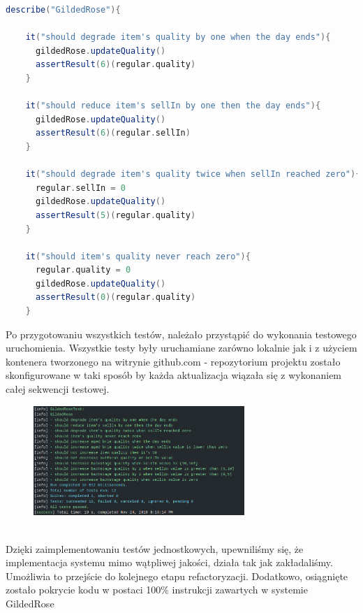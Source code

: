 \documentclass[a4paper, 11pt]{article}
\begin{document}
\begin{lstlisting}[language=scala]
  describe("GildedRose"){

    it("should degrade item's quality by one when the day ends"){
      gildedRose.updateQuality()
      assertResult(6)(regular.quality)
    }

    it("should reduce item's sellIn by one then the day ends"){
      gildedRose.updateQuality()
      assertResult(6)(regular.sellIn)
    }

    it("should degrade item's quality twice when sellIn reached zero"){
      regular.sellIn = 0
      gildedRose.updateQuality()
      assertResult(5)(regular.quality)
    }

    it("should item's quality never reach zero"){
      regular.quality = 0
      gildedRose.updateQuality()
      assertResult(0)(regular.quality)
    }
\end{lstlisting}
Po przygotowaniu wszystkich testów, należało przystąpić do wykonania testowego uruchomienia. Wszystkie testy były uruchamiane zarówno lokalnie jak i z użyciem kontenera tworzonego na witrynie github.com - repozytorium projektu zostało skonfigurowane w taki sposób by każda aktualizacja wiązała się z wykonaniem całej sekwencji testowej.
\begin{figure}[!tbh]
\includegraphics[width=8cm]{tests}
\centering
\end{figure}\\
Dzięki zaimplementowaniu testów jednostkowych, upewniliśmy się, że implementacja systemu mimo wątpliwej jakości, działa tak jak zakładaliśmy. Umożliwia to przejście do kolejnego etapu refactoryzacji.
Dodatkowo, osiągnięte zostało pokrycie kodu w postaci 100\% instrukcji zawartych w systemie GildedRose
\end{document}
